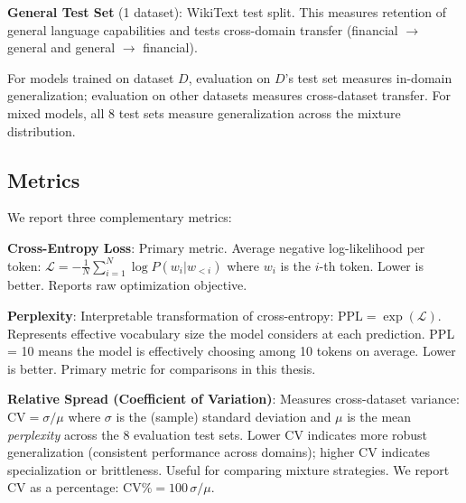 \textbf{General Test Set} (1 dataset): WikiText test split. This measures retention of general language capabilities and tests cross-domain transfer (financial $\to$ general and general $\to$ financial).

For models trained on dataset $D$, evaluation on $D$'s test set measures in-domain generalization; evaluation on other datasets measures cross-dataset transfer. For mixed models, all 8 test sets measure generalization across the mixture distribution.

\subsection{Metrics}

We report three complementary metrics:

\textbf{Cross-Entropy Loss}: Primary metric. Average negative log-likelihood per token: $\mathcal{L} = -\frac{1}{N}\sum_{i=1}^{N} \log P(w_i | w_{<i})$ where $w_i$ is the $i$-th token. Lower is better. Reports raw optimization objective.

\textbf{Perplexity}: Interpretable transformation of cross-entropy: $\text{PPL} = \exp(\mathcal{L})$. Represents effective vocabulary size the model considers at each prediction. PPL = 10 means the model is effectively choosing among 10 tokens on average. Lower is better. Primary metric for comparisons in this thesis.

\textbf{Relative Spread (Coefficient of Variation)}: Measures cross-dataset variance: $\text{CV} = \sigma / \mu$ where $\sigma$ is the (sample) standard deviation and $\mu$ is the mean \emph{perplexity} across the 8 evaluation test sets. Lower CV indicates more robust generalization (consistent performance across domains); higher CV indicates specialization or brittleness. Useful for comparing mixture strategies. We report CV as a percentage: $\text{CV}\% = 100\,\sigma/\mu$.

